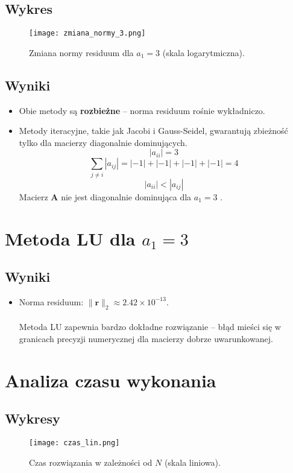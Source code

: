 \documentclass{article}
\begin{document}
\subsection{Wykres}
\begin{figure}[H]
    \centering
    \texttt{[image: zmiana\_normy\_3.png]}
    \caption{Zmiana normy residuum dla $a_1 = 3$ (skala logarytmiczna).}
    \label{fig:zmiana_3}
\end{figure}
\subsection{Wyniki}
\begin{itemize}
    \item Obie metody są \textbf{rozbieżne} – norma residuum rośnie wykładniczo.
    \item Metody iteracyjne, takie jak Jacobi i Gauss-Seidel, gwarantują zbieżność tylko dla macierzy diagonalnie dominujących.  
 \[
|a_{ii}| = 3 
\]
\[
\sum_{j \neq i} |a_{ij}| = |-1| + |-1| + |-1| + |-1| = 4
\]
 \[
|a_{ii}| < |a_{ij}|
\]
    Macierz $\mathbf{A}$ nie jest diagonalnie dominująca dla $a_1 = 3$ .
    \\
\end{itemize}

\section{ Metoda LU dla $a_1 = 3$}
\subsection{Wyniki}
\begin{itemize}
    \item Norma residuum: $\|\mathbf{r}\|_2 \approx 2.42 \times 10^{-13}$.
    \\\\ Metoda LU zapewnia bardzo dokładne rozwiązanie – błąd mieści się w granicach precyzji numerycznej dla macierzy dobrze uwarunkowanej.
\end{itemize}

\section{Analiza czasu wykonania}
\subsection{Wykresy}
\begin{figure}[H]
    \centering
    \texttt{[image: czas\_lin.png]}
    \caption{Czas rozwiązania w zależności od $N$ (skala liniowa).}
    \label{fig:czas_lin}
\end{figure}
\end{document}
